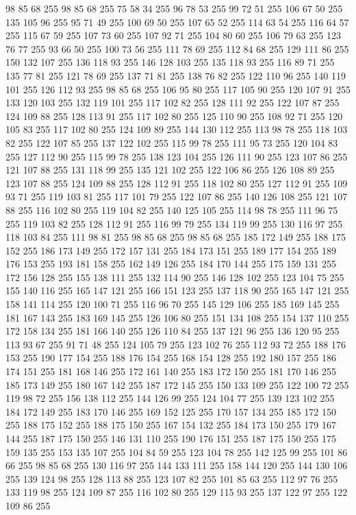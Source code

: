98 85 68 255 98 85 68 255 75 58 34 255 96 78 53 255 99 72 51 255 106 67 50 255 135 105 96 255 95 71 49 255 100 69 50 255 107 65 52 255 114 63 54 255 116 64 57 255 115 67 59 255 107 73 60 255 107 92 71 255 104 80 60 255 106 79 63 255 123 76 77 255 93 66 50 255 100 73 56 255 111 78 69 255 112 84 68 255 129 111 86 255 150 132 107 255 136 118 93 255 146 128 103 255 135 118 93 255 116 89 71 255 135 77 81 255 121 78 69 255 137 71 81 255 138 76 82 255 122 110 96 255 140 119 101 255 126 112 93 255 98 85 68 255 106 95 80 255 117 105 90 255 120 107 91 255 133 120 103 255 132 119 101 255 117 102 82 255 128 111 92 255 122 107 87 255 124 109 88 255 128 113 91 255 117 102 80 255 125 110 90 255 108 92 71 255 120 105 83 255 117 102 80 255 124 109 89 255 144 130 112 255 113 98 78 255 118 103 82 255 122 107 85 255 137 122 102 255 115 99 78 255 111 95 73 255 120 104 83 255 127 112 90 255 115 99 78 255 138 123 104 255 126 111 90 255
123 107 86 255 121 107 88 255 131 118 99 255 135 121 102 255 122 106 86 255 126 108 89 255 123 107 88 255 124 109 88 255 128 112 91 255 118 102 80 255 127 112 91 255 109 93 71 255 119 103 81 255 117 101 79 255 122 107 86 255 140 126 108 255 121 107 88 255 116 102 80 255 119 104 82 255 140 125 105 255 114 98 78 255 111 96 75 255 119 103 82 255 128 112 91 255 116 99 79 255 134 119 99 255 130 116 97 255 118 103 84 255 111 98 81 255 98 85 68 255 98 85 68 255 185 172 149 255 188 175 152 255 186 173 149 255 172 157 131 255 184 173 151 255 189 177 154 255 189 176 153 255 193 181 158 255 162 149 126 255 184 170 144 255 175 159 131 255 172 156 128 255 155 138 111 255 132 114 90 255 146 128 102 255 123 104 75 255 155 140 116 255 165 147 121 255 166 151 123 255 137 118 90 255 165 147 121 255 158 141 114 255 120 100 71 255 116 96 70 255 145 129 106 255 185 169 145 255 181 167 143 255 183 169 145 255 126 106 80 255 151 134 108 255 154 137 110 255 172 158 134 255 181 166 140 255
126 110 84 255 137 121 96 255 136 120 95 255 113 93 67 255 91 71 48 255 124 105 79 255 123 102 76 255 112 93 72 255 188 176 153 255 190 177 154 255 188 176 154 255 168 154 128 255 192 180 157 255 186 174 151 255 181 168 146 255 172 161 140 255 183 172 150 255 181 170 146 255 185 173 149 255 180 167 142 255 187 172 145 255 150 133 109 255 122 100 72 255 119 98 72 255 156 138 112 255 144 126 99 255 124 104 77 255 139 123 102 255 184 172 149 255 183 170 146 255 169 152 125 255 170 157 134 255 185 172 150 255 188 175 152 255 188 175 150 255 167 154 132 255 184 173 150 255 179 167 144 255 187 175 150 255 146 131 110 255 190 176 151 255 187 175 150 255 175 159 135 255 153 135 107 255 104 84 59 255 123 104 78 255 142 125 99 255 101 86 66 255 98 85 68 255 130 116 97 255 144 133 111 255 158 144 120 255 144 130 106 255 139 124 98 255 128 113 88 255 123 107 82 255 101 85 63 255 112 97 76 255 133 119 98 255 124 109 87 255 116 102 80 255 129 115 93 255 137 122 97 255 122 109 86 255
